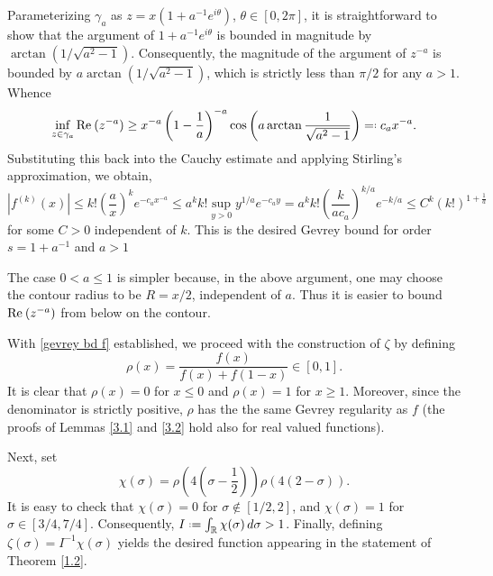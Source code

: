 \documentclass[11pt]{amsart}
\numberwithin{equation}{section}
\def\Re{{\rm Re}\:}
\newcommand*{\defeq}{\mathrel{\vcenter{\baselineskip0.5ex \lineskiplimit0pt

                     \hbox{\scriptsize.}\hbox{\scriptsize.}}}%
                     =}
\newcommand*{\qefed}{=\mathrel{\vcenter{\baselineskip0.5ex \lineskiplimit0pt

                     \hbox{\scriptsize.}\hbox{\scriptsize.}}}%
                     }
\begin{document}
Parameterizing $\gamma_a$ as $z = x(1 + a^{-1}e^{i\theta})$, $\theta \in [0,2 \pi]$, it is straightforward to show that the argument of $1 + a^{-1} e^{i\theta}$ is bounded in magnitude by $\arctan(1/\sqrt{a^2 - 1})$. Consequently, the magnitude of the argument of $z^{-a}$ is bounded by $a \arctan(1/\sqrt{a^2 - 1})$, which is strictly less than $\pi/2$ for any $a > 1$. Whence
\begin{equation*}
\inf_{z \in \gamma_a} \Re(z^{-a}) \ge x^{-a} \left(1 - \frac{1}{a}\right)^{-a} \cos\left(a \arctan\frac{1}{\sqrt{a^2-1}}\right) \qefed c_a x^{-a}.
\end{equation*}
Substituting this back into the Cauchy estimate and applying Stirling's approximation, we obtain,
\begin{equation} \label{gevrey bd f}
    |f^{(k)}(x)| \le k! \left(\frac{a}{x}\right)^k e^{-c_a x^{-a}} \le a^k k! \sup_{y > 0} y^{1/a} e^{-c_a y} = a^k k!  \left( \frac{k}{ac_a} \right)^{k/a} e^{-k/a} \le C^k (k!)^{1 + \frac{1}{a}}
\end{equation}
for some $C > 0$ independent of $k$. This is the desired Gevrey bound for order $s = 1 + a^{-1}$ and $a > 1$

The case $0 < a \le 1$ is simpler because, in the above argument, one may choose the contour radius to be $R = x/2$, independent of $a$. Thus it is easier to bound $\Re(z^{-a})$ from below on the contour. 

With \eqref{gevrey bd f} established, we proceed with the construction of $\zeta$ by defining 
\begin{equation}
    \rho(x) = \frac{f(x)}{f(x) + f(1-x)} \in [0,1].
\end{equation}
It is clear that $\rho(x) = 0$ for $x \le 0$ and $\rho(x) = 1$ for $x \ge 1$. Moreover, since the denominator is strictly positive, $\rho$ has the the same Gevrey regularity as $f$ (the proofs of Lemmas \ref{3.1} and \ref{3.2} hold also for real valued functions). 

Next, set
\begin{equation}
    \chi(\sigma) = \rho\left(4\left(\sigma - \frac{1}{2}\right)\right) \rho\left(4\left(2 - \sigma\right)\right).
\end{equation}
It is easy to check that $\chi(\sigma) = 0$ for $\sigma \notin [1/2, 2]$, and $\chi(\sigma) = 1$ for $\sigma \in [3/4, 7/4]$. Consequently, $I \defeq \int_{\mathbb{R}} \chi(\sigma) \, d\sigma > 1$. Finally, defining $\zeta(\sigma) = I^{-1} \chi(\sigma)$ yields the desired function appearing in the statement of Theorem \ref{1.2}.
\end{document}
